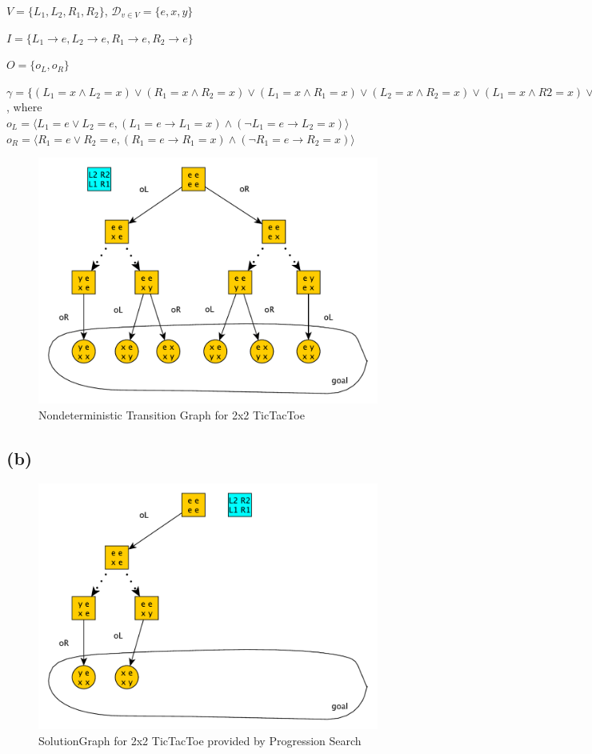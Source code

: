 \documentclass[11pt,a4paper]{article}
\begin{document}
$V = \{L_1, L_2, R_1, R_2\}$, $\mathscr{D}_{v\in V}=\{e, x, y\}$

$I = \{L_1 \to e, L_2 \to e, R_1 \to e, R_2 \to e\}$

$O = \{o_L, o_R\}$

$\gamma = \{(L_1=x \land L_2=x) \lor (R_1=x \land R_2=x) \lor (L_1=x \land R_1=x) \lor (L_2=x \land R_2=x) \lor (L_1=x \land R2=x) \lor (L_2=x \land R_1=x)   \}$, where \\

$o_L = \langle L_1=e \lor L_2=e, (L_1=e \to L_1=x) \land (\lnot L_1=e \to L_2=x)\rangle$ \\
$o_R = \langle R_1=e \lor R_2=e, (R_1=e \to R_1=x) \land (\lnot R_1=e \to R_2=x)\rangle$

\begin{figure}[h!]
\centering
\includegraphics[scale=0.45]{NondeterministicTicTacToe}
\caption{Nondeterministic Transition Graph for 2x2 TicTacToe}
\end{figure}

\subsection*{(b)}
\begin{figure}[h!]
\centering
\includegraphics[scale=0.45]{NondeterministicTicTacToe_SolutionGraph}
\caption{SolutionGraph for 2x2 TicTacToe provided by Progression Search}
\end{figure}


\label{lastpage}
\end{document}
